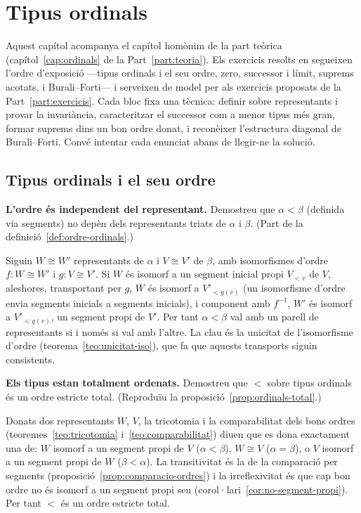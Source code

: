 \chapter{Tipus ordinals}\label{cap:practica-ordinals}

Aquest capítol acompanya el capítol homònim de la part teòrica (capítol~\ref{cap:ordinals} de la Part~\ref{part:teoria}). Els exercicis resolts en segueixen l'ordre d'exposició ---tipus ordinals i el seu ordre, zero, successor i límit, suprems acotats, i Burali--Forti--- i serveixen de model per als exercicis proposats de la Part~\ref{part:exercicis}. Cada bloc fixa una tècnica: definir sobre representants i provar la invariància, caracteritzar el successor com a menor tipus més gran, formar suprems dins un bon ordre donat, i reconèixer l'estructura diagonal de Burali--Forti. Convé intentar cada enunciat abans de llegir-ne la solució.

\section{Tipus ordinals i el seu ordre}\label{prac:tipus-ordinals}

\begin{exercici}
\textbf{L'ordre és independent del representant.} Demostreu que \(\alpha<\beta\) (definida via segments) no depèn dels representants triats de \(\alpha\) i \(\beta\). (Part de la definició~\ref{def:ordre-ordinals}.)
\end{exercici}
\begin{solucio}
Siguin \(W\cong W'\) representants de \(\alpha\) i \(V\cong V'\) de \(\beta\), amb isomorfismes d'ordre \(f\colon W\cong W'\) i \(g\colon V\cong V'\). Si \(W\) és isomorf a un segment inicial propi \(V_{<v}\) de \(V\), aleshores, transportant per \(g\), \(W\) és isomorf a \(V'_{<g(v)}\) (un isomorfisme d'ordre envia segments inicials a segments inicials), i component amb \(f^{-1}\), \(W'\) és isomorf a \(V'_{<g(v)}\), un segment propi de \(V'\). Per tant \(\alpha<\beta\) val amb un parell de representants si i només si val amb l'altre. La clau és la unicitat de l'isomorfisme d'ordre (teorema~\ref{teo:unicitat-iso}), que fa que aquests transports siguin consistents.
\end{solucio}

\begin{exercici}
\textbf{Els tipus estan totalment ordenats.} Demostreu que \(<\) sobre tipus ordinals és un ordre estricte total. (Reproduïu la proposició~\ref{prop:ordinals-total}.)
\end{exercici}
\begin{solucio}
Donats dos representants \(W\), \(V\), la tricotomia i la comparabilitat dels bons ordres (teoremes~\ref{teo:tricotomia} i~\ref{teo:comparabilitat}) diuen que es dona exactament una de: \(W\) isomorf a un segment propi de \(V\) (\(\alpha<\beta\)), \(W\cong V\) (\(\alpha=\beta\)), o \(V\) isomorf a un segment propi de \(W\) (\(\beta<\alpha\)). La transitivitat és la de la comparació per segments (proposició~\ref{prop:comparacio-ordres}) i la irreflexivitat és que cap bon ordre no és isomorf a un segment propi seu (corol·lari~\ref{cor:no-segment-propi}). Per tant \(<\) és un ordre estricte total.
\end{solucio}

